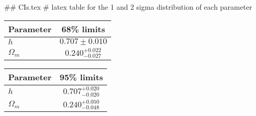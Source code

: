 ## CIs.tex
# latex table for the 1 and 2 sigma distribution of each parameter

\begin{tabular} { l  c}
 Parameter &  68\% limits\\
\hline
{\boldmath$h              $} & $0.707\pm 0.010            $\\
{\boldmath$\Omega_m       $} & $0.240^{+0.022}_{-0.027}   $\\
\hline
\end{tabular}

\begin{tabular} { l  c}
 Parameter &  95\% limits\\
\hline
{\boldmath$h              $} & $0.707^{+0.020}_{-0.020}   $\\
{\boldmath$\Omega_m       $} & $0.240^{+0.050}_{-0.048}   $\\
\hline
\end{tabular}
